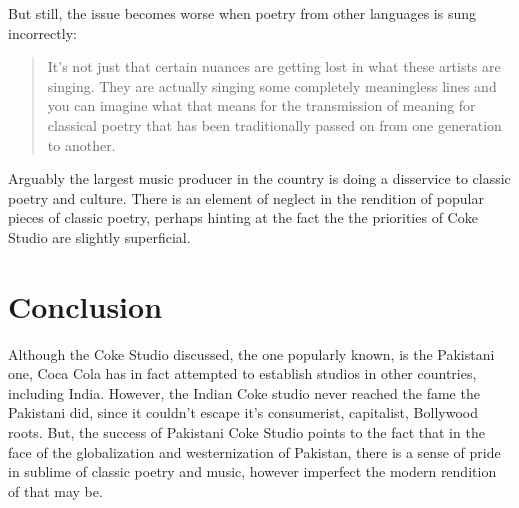 \documentclass{article}
\begin{document}
But still, the issue becomes worse when poetry from other languages is sung
incorrectly: 

\begin{quote}

 It's not just that certain nuances are getting lost in what these artists are
 singing. They are actually singing some completely meaningless lines and you
 can imagine what that means for the transmission of meaning for classical
 poetry that has been traditionally passed on from one generation to another.

\end{quote}

Arguably the largest music producer in the country is doing a disservice to 
classic poetry and culture. There is an element of neglect in the rendition of
popular pieces of classic poetry, perhaps hinting at the fact the the priorities of 
Coke Studio are slightly superficial. 

\section{Conclusion}

Although the Coke Studio discussed, the one popularly known, is the Pakistani
one, Coca Cola has in fact attempted to establish studios in other countries,
including India. However, the Indian Coke studio never reached the fame the
Pakistani did, since it couldn't escape it's consumerist, capitalist, Bollywood
roots. But, the success of Pakistani Coke Studio points to the fact that in the
face of the globalization and westernization of Pakistan, there is a sense of
pride in sublime of classic poetry and music, however imperfect the modern
rendition of that may be. 


\printbibliography
\end{document}
